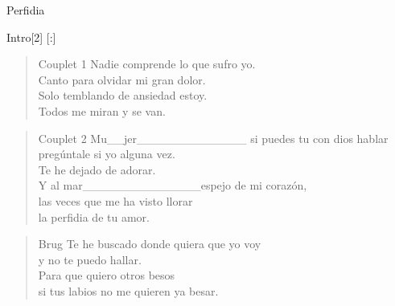 \begin{song}[bolero]{Perfidia}
\begin{instrumental}{Intro}[2]
[:]
\end{instrumental}

\begin{verse}{Couplet 1}
Nadie comprende lo que sufro yo.\\
Canto para olvidar mi gran dolor.\\
Solo temblando de ansiedad estoy.\\
Todos me miran y se van. \hspace{3em}
\end{verse}


\begin{verse}{Couplet 2}
Mu\_{}\_{}jer\_{}\_{}\_{}\_{}\_{}\_{}\_{}\_{}\_{}\_{}\_{}\_{}\_{} si puedes tu con dios hablar \hspace{3em}\\
preg\'{u}ntale si yo alguna vez.\\
Te he dejado de adorar. \hspace{3em}\\
Y al mar\_{}\_{}\_{}\_{}\_{}\_{}\_{}\_{}\_{}\_{}\_{}\_{}\_{}\_{}espejo de mi coraz\'{o}n,\hspace{3em}\\
las veces que me ha visto llorar\\
la perfidia de tu amor.\hspace{3em}
\end{verse}

\begin{verse}{Brug}
Te he buscado donde quiera que yo voy\\
y no te puedo hallar.\\
Para que quiero otros besos\\
si tus labios no me quieren ya besar.\hspace{3em}
\end{verse}


\end{song}

